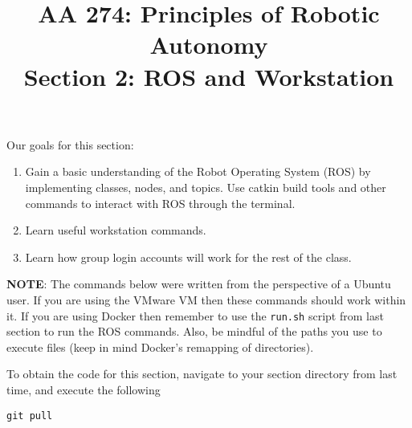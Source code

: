 \documentclass{article}
\title{AA 274: Principles of Robotic Autonomy \\ Section 2: ROS and Workstation}
\date{}
\begin{document}
\maketitle
\pagestyle{fancy}

Our goals for this section:
\begin{enumerate}
	\item Gain a basic understanding of the Robot Operating System (ROS) by implementing classes, nodes, and topics. Use catkin build tools and other commands to interact with ROS through the terminal.
	\item Learn useful workstation commands.
	\item Learn how group login accounts will work for the rest of the class. 
\end{enumerate}

\textbf{NOTE}: The commands below were written from the perspective of a Ubuntu user. If you are using the VMware VM then these commands should work within it. If you are using Docker then remember to use the \texttt{run.sh} script from last section to run the ROS commands. Also, be mindful of the paths you use to execute files (keep in mind Docker's remapping of directories).

To obtain the code for this section, navigate to your section directory from last time, and execute the following

\begin{lstlisting}
git pull
\end{lstlisting}



\end{document}
